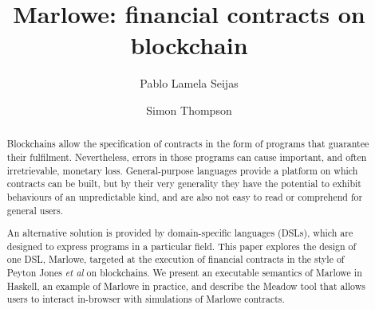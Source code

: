 \documentclass[runningheads]{llncs}
\begin{document}
%
%
\title {Marlowe: financial contracts on blockchain}
%
%
\author{Pablo Lamela Seijas\\
\and Simon Thompson}
%
%


\begin{abstract}

Blockchains allow the specification of contracts in the form of programs that guarantee their fulfilment. 
Nevertheless, errors in those programs can cause important, and often irretrievable, monetary loss. General-purpose 
languages provide a platform on which contracts can be built, but by their very generality they have the potential to 
exhibit behaviours of an unpredictable kind, and are also not easy to read or comprehend for general users. 

An alternative solution is provided by domain-specific languages (DSLs), which are designed to express programs in a 
particular field. This paper explores the design of one DSL, Marlowe, targeted at the execution of financial 
contracts in the style of Peyton Jones \emph{et al} on blockchains. We present an executable semantics of Marlowe in Haskell, an example of Marlowe in practice, and describe the Meadow tool that allows users to interact in-browser with simulations of Marlowe contracts.

\end{abstract}



%
%


\maketitle

\end{document}
